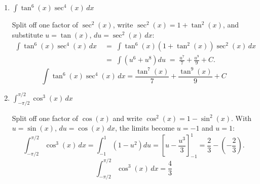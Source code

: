 \documentclass[12pt]{article}
\newcommand{\ds}{\displaystyle}
\begin{document}
\begin{enumerate}
\begin{enumerate}
\begin{solution}
Split off one factor of $\sin(x)$, write $\sin^2(x)=1-\cos^2(x)$, and substitute
$u=\cos(x)$, $du=-\sin(x)\,dx$:
\begin{align*}
  \int \sin^3(x)\cos^4(x)\,dx
  &\;=\; \int\left(1-\cos^2(x)\right)\cos^4(x)\sin(x)\,dx \\[4pt]
  &\;=\; -\int\left(1-u^2\right)u^4\,du
  \;=\; \int\left(u^6-u^4\right)du
  \;=\; \frac{u^7}{7}-\frac{u^5}{5}+C .
\end{align*}
\[
\boxed{\ \int \sin^3(x)\cos^4(x)\,dx=\frac{\cos^7(x)}{7}-\frac{\cos^5(x)}{5}+C\ }
\]
\end{solution}

  \item $\ds \int \tan^6(x) \sec^4(x) \, dx$

\begin{solution}
Split off one factor of $\sec^2(x)$, write $\sec^2(x)=1+\tan^2(x)$, and substitute
$u=\tan(x)$, $du=\sec^2(x)\,dx$:
\begin{align*}
  \int \tan^6(x)\sec^4(x)\,dx
  &\;=\; \int \tan^6(x)\left(1+\tan^2(x)\right)\sec^2(x)\,dx \\[4pt]
  &\;=\; \int\left(u^6+u^8\right)du
  \;=\; \frac{u^7}{7}+\frac{u^9}{9}+C .
\end{align*}
\[
\boxed{\ \int \tan^6(x)\sec^4(x)\,dx=\frac{\tan^7(x)}{7}+\frac{\tan^9(x)}{9}+C\ }
\]
\end{solution}

  \item $\ds \int_{-\pi / 2}^{\pi / 2} \cos^3(x) \, dx$

\begin{solution}
Split off one factor of $\cos(x)$ and write $\cos^2(x)=1-\sin^2(x)$.  With
$u=\sin(x)$, $du=\cos(x)\,dx$, the limits become $u=-1$ and $u=1$:
\[
\int_{-\pi/2}^{\pi/2}\cos^3(x)\,dx=\int_{-1}^{1}\left(1-u^2\right)du
=\left[u-\frac{u^3}{3}\right]_{-1}^{1}=\frac{2}{3}-\left(-\frac{2}{3}\right).
\]
\[
\boxed{\ \int_{-\pi/2}^{\pi/2}\cos^3(x)\,dx=\frac{4}{3}\ }
\]
\end{solution}

  \end{enumerate}
\end{enumerate}
\end{document}
